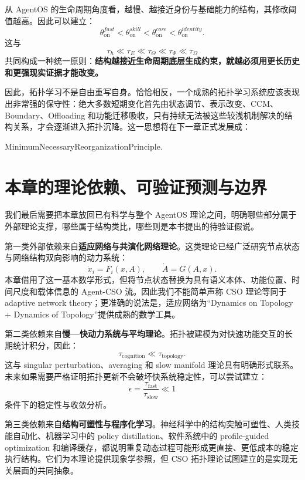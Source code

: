 从 AgentOS 的生命周期角度看，越慢、越接近身份与基础能力的结构，其修改阈值越高。因此可以建立：
\[
\theta_{\mathrm{on}}^{fast}
<
\theta_{\mathrm{on}}^{skill}
<
\theta_{\mathrm{on}}^{core}
<
\theta_{\mathrm{on}}^{identity}.
\]
这与
\[
\tau_h
\ll
\tau_E
\ll
\tau_\Theta
\ll
\tau_\Psi
\ll
\tau_\Omega
\]
共同构成一种统一原则：\textbf{结构越接近生命周期底层生成约束，就越必须用更长历史和更强现实证据才能改变。}

因此，拓扑学习不是自由重写自身。恰恰相反，一个成熟的拓扑学习系统应该表现出非常强的保守性：绝大多数短期变化首先由状态调节、表示改变、CCM、Boundary、Offloading 和功能迁移吸收，只有持续无法被这些较浅机制解决的结构关系，才会逐渐进入拓扑沉降。这一思想将在下一章正式发展成：
\begin{statementbox}
MinimumNecessaryReorganizationPrinciple.
\end{statementbox}


\section{本章的理论依赖、可验证预测与边界}

我们最后需要把本章放回已有科学与整个 AgentOS 理论之间，明确哪些部分属于外部理论支撑，哪些属于结构类比，哪些则是本书提出的待验证假说。

第一类外部依赖来自\textbf{适应网络与共演化网络理论}。这类理论已经广泛研究节点状态与网络结构双向影响的动力系统：
\[
\dot x_i
=
F_i(x,A),
\qquad
\dot A
=
G(A,x).
\]
本章借用了这一基本数学形式，但将节点状态替换为具有语义本体、功能位置、时间尺度和载体信息的 Agent-CSO 流。因此我们不能简单声称 CSO 理论等同于 adaptive network theory；更准确的说法是，适应网络为``Dynamics on Topology + Dynamics of Topology''提供成熟的数学工具。

第二类依赖来自\textbf{慢—快动力系统与平均理论}。拓扑被建模为对快速功能交互的长期统计积分，因此：
\[
\tau_{\mathrm{cognition}}
\ll
\tau_{\mathrm{topology}}.
\]
这与 singular perturbation、averaging 和 slow manifold 理论具有明确形式联系。未来如果需要严格证明拓扑更新不会破坏快系统稳定性，可以尝试建立：
\[
\epsilon
=
\frac{
\tau_{\mathrm{fast}}
}{
\tau_{\mathrm{slow}}
}
\ll1
\]
条件下的稳定性与收敛分析。

第三类依赖来自\textbf{结构可塑性与程序化学习}。神经科学中的结构突触可塑性、人类技能自动化、机器学习中的 policy distillation、软件系统中的 profile-guided optimization 和编译缓存，都说明重复动态过程可能形成更直接、更低成本的稳定执行结构。它们为本理论提供现象学参照，但 CSO 拓扑理论试图建立的是实现无关层面的共同抽象。

